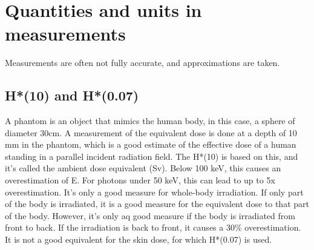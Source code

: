 \section{Quantities and units in measurements}
Measurements are often not fully accurate, and approximations are taken. 
\subsection{H*(10) and H*(0.07)}
A phantom is an object that mimics the human body, in this case, a sphere of diameter 30cm. A measurement of the equivalent dose is done at a depth of 10 mm in the phantom, which is a good estimate of the effective dose of a human standing in a parallel incident radiation field. The H*(10) is based on this, and it's called the ambient dose equivalent (Sv). Below 100 keV, this causes an overestimation of E. For photons under 50 keV, this can lead to up to 5x overestimation. It's only a good measure for whole-body irradiation. If only part of the body is irradiated, it is a good measure for the equivalent dose to that part of the body. However, it's only aq good measure if the body is irradiated from front to back. If the irradiation is back to front, it causes a 30\% overestimation. It is not a good equivalent for the skin dose, for which H*(0.07) is used.
